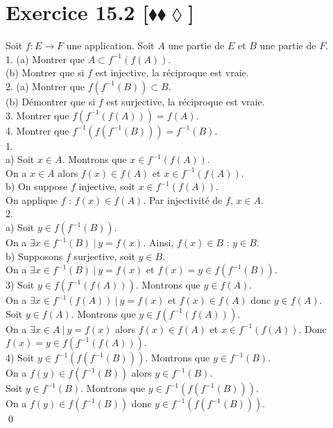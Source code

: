 \documentclass[10pt]{article}
\begin{document}
\section*{Exercice 15.2 [$\blacklozenge\blacklozenge\lozenge$]}
\begin{tcolorbox}[enhanced, width=7.6in, center, size=fbox, fontupper=\large, drop shadow southwest]
    Soit $f:E\to F$ une application. Soit $A$ une partie de $E$ et $B$ une partie de $F$.\\
    1. (a) Montrer que $A \subset f^{-1}(f(A))$.\\
    (b) Montrer que si $f$ est injective, la réciproque est vraie.\\
    2. (a) Montrer que $f(f^{-1}(B)) \subset B$.\\
    (b) Démontrer que si $f$ est surjective, la réciproque est vraie.\\
    3. Montrer que $f(f^{-1}(f(A))) = f(A)$.\\
    4. Montrer que $f^{-1}(f(f^{-1}(B)))=f^{-1}(B)$.\\[0.15cm]
    1.\\
    a) Soit $x\in A$. Montrons que $x\in f^{-1}(f(A))$.\\
    On a $x\in A$ alors $f(x) \in f(A)$ et $x\in f^{-1}(f(A))$.\\
    b) On suppose $f$ injective, soit $x \in f^{-1}(f(A))$.\\
    On applique $f$ : $f(x) \in f(A)$. Par injectivité de $f$, $x \in A$.\\[0.2cm]
    2.\\
    a) Soit $y \in f(f^{-1}(B))$.\\
    On a $\exists x \in f^{-1}(B) ~ | ~ y = f(x)$. Ainsi, $f(x)\in B$ : $y\in B$.\\
    b) Supposons $f$ surjective, soit $y\in B$.\\
    On a $\exists x \in f^{-1}(B) ~ | ~ y = f(x)$ et $f(x) = y \in f(f^{-1}(B))$.\\[0.2cm]
    3) Soit $y\in f(f^{-1}(f(A)))$. Montrons que $y\in f(A)$.\\
    On a $\exists x \in f^{-1}(f(A)) ~ | ~ y = f(x)$ et $f(x) \in f(A)$ donc $y \in f(A)$.\\
    Soit $y\in f(A)$. Montrons que $y\in f(f^{-1}(f(A)))$.\\
    On a $\exists x \in A ~ | ~ y = f(x)$ alors $f(x) \in f(A)$ et $x\in f^{-1}(f(A))$. Donc $f(x) = y \in f(f^{-1}(f(A)))$.\\[0.2cm]
    4) Soit $y \in f^{-1}(f(f^{-1}(B)))$. Montrons que $y \in f^{-1}(B)$.\\
    On a $f(y) \in f(f^{-1}(B))$ alors $y \in f^{-1}(B)$.\\
    Soit $y\in f^{-1}(B)$. Montrons que $y\in f^{-1}(f(f^{-1}(B)))$.\\
    On a $f(y) \in f(f^{-1}(B))$ donc $y \in f^{-1}(f(f^{-1}(B)))$.\\
    \qed
\end{tcolorbox}
\end{document}
